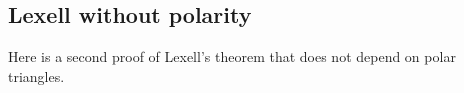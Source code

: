 %
%
%


\subsection{Lexell without polarity}

Here is a second proof of Lexell's theorem that does not depend on polar triangles.

